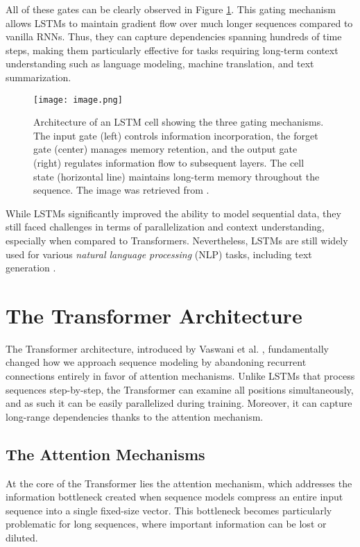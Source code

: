 All of these gates can be clearly observed in Figure \ref{fig:lstm-architecture}. This gating mechanism allows LSTMs to maintain gradient flow over much longer sequences compared to vanilla RNNs. Thus, they can capture dependencies spanning hundreds of time steps, making them particularly effective for tasks requiring long-term context understanding such as language modeling, machine translation, and text summarization.
\begin{figure}[!htbp]
\centering
\texttt{[image: image.png]}
\caption[LSTM cell architecture]{Architecture of an LSTM cell showing the three gating mechanisms. The input gate (left) controls information incorporation, the forget gate (center) manages memory retention, and the output gate (right) regulates information flow to subsequent layers. The cell state (horizontal line) maintains long-term memory throughout the sequence. The image was retrieved from \cite{hinton-lstm}.}
\label{fig:lstm-architecture}
\end{figure}

While LSTMs significantly improved the ability to model sequential data, they still faced challenges in terms of parallelization and context understanding, especially when compared to Transformers.  Nevertheless, LSTMs are still widely used for various \textit{natural language processing} (NLP) tasks, including text generation \cite{lstm_textgeneration}.

\section{The Transformer Architecture}  \label{transformer_architecture}

The Transformer architecture, introduced by Vaswani et al. \cite{attention_is_all_you_need}, fundamentally changed how we approach sequence modeling by abandoning recurrent connections entirely in favor of attention mechanisms. Unlike LSTMs that process sequences step-by-step, the Transformer can examine all positions simultaneously, and as such it can be easily parallelized during training. Moreover, it can capture long-range dependencies thanks to the attention mechanism.

\subsection{The Attention Mechanisms}

At the core of the Transformer lies the attention mechanism, which addresses the information bottleneck created when sequence models compress an entire input sequence into a single fixed-size vector. This bottleneck becomes particularly problematic for long sequences, where important information can be lost or diluted.

